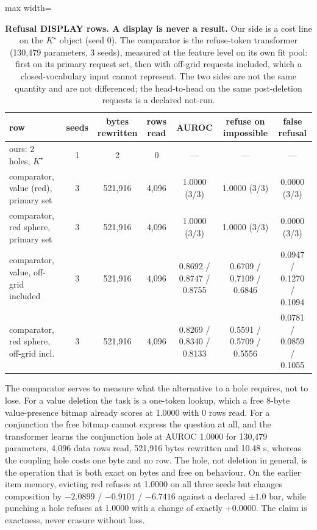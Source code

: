 \documentclass{article} %
\newcommand{\Kstar}{\ensuremath{K^{\star}}}
\begin{document}
\begin{table}[t]
\centering\small
\caption{\textbf{Refusal DISPLAY rows. A display is never a result.} Our side is a cost line
on the $\Kstar$ object (seed 0). The comparator is the refuse-token transformer (130,479
parameters, 3 seeds), measured at the feature level on its own fit pool: first on its primary
request set, then with off-grid requests included, which a closed-vocabulary input cannot
represent. The two sides are not the same quantity and are not differenced; the head-to-head on
the same post-deletion requests is a declared not-run.}
\label{tab:hole}
\setlength{\tabcolsep}{3pt}
\begin{adjustbox}{max width=\linewidth}\begin{tabular}{lcccccc}
\toprule
row & seeds & bytes rewritten & rows read & AUROC & refuse on impossible & false refusal \\
\midrule
ours: 2 holes, $\Kstar$ & 1 & 2 & 0 & --- & --- & --- \\ %
comparator, value (red), primary set & 3 & 521,916 & 4,096 & 1.0000 (3/3) & 1.0000 (3/3) & 0.0000 (3/3) \\
comparator, red sphere, primary set & 3 & 521,916 & 4,096 & 1.0000 (3/3) & 1.0000 (3/3) & 0.0000 (3/3) \\
comparator, value, off-grid included & 3 & 521,916 & 4,096 & 0.8692 / 0.8747 / 0.8755 & 0.6709 / 0.7109 / 0.6846 & 0.0947 / 0.1270 / 0.1094 \\
comparator, red sphere, off-grid incl. & 3 & 521,916 & 4,096 & 0.8269 / 0.8340 / 0.8133 & 0.5591 / 0.5709 / 0.5556 & 0.0781 / 0.0859 / 0.1055 \\
\bottomrule
\end{tabular}\end{adjustbox}
\end{table}

\noindent The comparator serves to measure what the alternative to a hole requires, not to lose. For a value
deletion the task is a one-token lookup, which a free 8-byte value-presence bitmap already scores
at 1.0000 with 0 rows read. For a conjunction the free bitmap cannot express the question at
all, and the transformer learns the conjunction hole at AUROC 1.0000 for 130,479 parameters,
4,096 data rows read, 521,916 bytes rewritten and 10.48 s, whereas the coupling hole costs one
byte and no row. %
\noindent The hole, not deletion in general, is the operation that is both exact on bytes and
free on behaviour. On the earlier item memory, evicting red refuses at 1.0000 on all three
seeds but changes composition by $-2.0899$ / $-0.9101$ / $-6.7416$ against a declared $\pm1.0$ bar,
while punching a hole refuses at 1.0000 with a change of exactly $+0.0000$. %
The claim is exactness, never erasure without loss.
\end{document}
